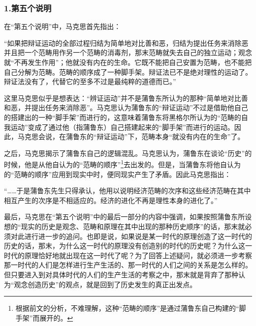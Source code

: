 \documentclass[a4paper,twoside,12pt,AutoFakeBold]{ctexart}
\begin{document}
\subsubsection{1.第五个说明}

在“第五个说明”中，马克思首先指出：
\begin{adjustwidth}{2em}{2em}
    \qquad\fangsong
    “如果把辩证运动的全部过程归结为简单地对比善和恶，归结为提出任务来消除恶并且把一个范畴用作另一个范畴的消毒剂，那末范畴就失去自己的独立运动；观念就“不再发生作用”；他就没有内在的生命。它既不能把自己安置为范畴，也不能把自己分解为范畴。范畴的顺序成了一种脚手架。辩证法已不是绝对理性的运动了。辩证法没有了，代替它的至多不过是最纯粹的道德而已。”
\end{adjustwidth}

这里马克思似乎是想表达：“辨证运动”并不是蒲鲁东所认为的那种“简单地对比善和恶，并提出任务来消除恶”。马克思认为蒲鲁东的“辩证运动”不过是借助他自己的搭建出的一种“脚手架”而进行的，这意味着蒲鲁东将黑格尔所认为的“范畴的自我运动”变成了通过他（指蒲鲁东）自己搭建起来的“脚手架”而进行的运动。因此，马克思会说，在蒲鲁东的“辩证运动”下，范畴本身“就没有内在的生命”了。

之后，马克思揭示了蒲鲁东自己的逻辑混乱。马克思认为，蒲鲁东在谈论“历史”的时候，他是从他自认为的“范畴的顺序”\footnote{根据前文的分析，不难理解，这种“范畴的顺序”是通过蒲鲁东自己构建的“脚手架”而展开的。}去出发的。但是，当蒲鲁东将他自认为的“范畴的顺序”应用到现实中时，便同现实产生了矛盾。因此马克思指出：
\begin{adjustwidth}{2em}{2em}
    \qquad\fangsong
    “……于是蒲鲁东先生只得承认，他用以说明经济范畴的次序和这些经济范畴在其中相互产生的次序是不相适应的。经济的进化不再是理性本身的进化了。”
\end{adjustwidth}

最后，马克思在“第五个说明”中的最后一部分的内容中强调，如果按照蒲鲁东所设想的“现实的历史是观念、范畴和原理在其中出现的那种历史顺序”的话，那末就必须对此进行进一步的追问。也即是说，如果说是某一时代的原理创造了这一时代的历史的话，那末，为什么这一时代的原理没有创造别的时代的历史呢？为什么这一时代的原理恰好地就出现在这一时代了呢？为了回答上述疑问，就必须进一步考察那一时代的人们是怎样进行生产生活的、那一时代的人们之间的关系是怎么样的。但只要进入到对具体时代的人们的生产生活的考察之中，那末就是背弃了那种认为“观念创造历史”的观点，就是回到了历史发生的真正出发点。
\end{document}
